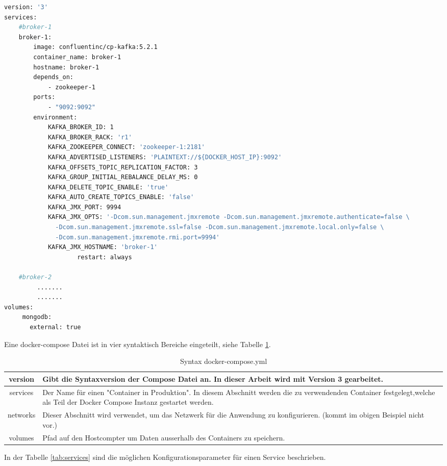 \begin{lstlisting}[basicstyle=\tiny,float=h,language=bash,frame=tb,caption={Aufbau docker-compose.yml},label=lst: docker-compose.yml]
version: '3'
services:
	#broker-1
	broker-1: 
		image: confluentinc/cp-kafka:5.2.1
		container_name: broker-1
		hostname: broker-1
		depends_on:
			- zookeeper-1
		ports:
			- "9092:9092"
		environment:
			KAFKA_BROKER_ID: 1
			KAFKA_BROKER_RACK: 'r1'
			KAFKA_ZOOKEEPER_CONNECT: 'zookeeper-1:2181'
			KAFKA_ADVERTISED_LISTENERS: 'PLAINTEXT://${DOCKER_HOST_IP}:9092'
			KAFKA_OFFSETS_TOPIC_REPLICATION_FACTOR: 3
			KAFKA_GROUP_INITIAL_REBALANCE_DELAY_MS: 0
			KAFKA_DELETE_TOPIC_ENABLE: 'true'
			KAFKA_AUTO_CREATE_TOPICS_ENABLE: 'false'
			KAFKA_JMX_PORT: 9994
			KAFKA_JMX_OPTS: '-Dcom.sun.management.jmxremote -Dcom.sun.management.jmxremote.authenticate=false \
			  -Dcom.sun.management.jmxremote.ssl=false -Dcom.sun.management.jmxremote.local.only=false \
			  -Dcom.sun.management.jmxremote.rmi.port=9994'
			KAFKA_JMX_HOSTNAME: 'broker-1'
    				restart: always
    				
    #broker-2		
		 .......
		 .......
volumes:
	 mongodb:
	   external: true

\end{lstlisting}  

Eine docker-compose Datei ist in vier syntaktisch Bereiche eingeteilt, siehe Tabelle \ref{tab:datei_syntax}.

\begin{table}[H]
	\centering
		\begin{tabular}{c|p{12cm}}
		\hline
			version & Gibt die Syntaxversion der Compose Datei an. In dieser Arbeit wird mit Version 3 gearbeitet. \\ \midrule
			services  & Der Name f{\"u}r einen "Container in Produktion". In diesem Abschnitt werden die zu verwendenden
			Container festgelegt,welche als Teil der Docker Compose Instanz gestartet werden. \\ \midrule
			networks & Dieser Abschnitt wird verwendet, um das Netzwerk f{\"u}r die Anwendung zu konfigurieren. (kommt im obigen Beispiel nicht vor.) \\ \midrule
			volumes & Pfad auf den Hostcompter um Daten ausserhalb des Containers zu speichern.\\ \bottomrule
		\end{tabular}
	\caption{Syntax docker-compose.yml}
	\label{tab:datei_syntax}
\end{table}

In der Tabelle \ref{tab:services} sind die m{\"o}glichen Konfigurationsparameter f{\"u}r einen Service beschrieben.

